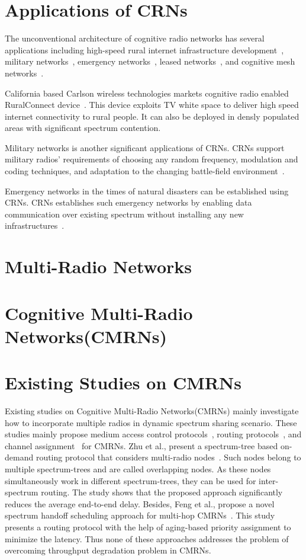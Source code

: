 \section{Applications of CRNs}
The unconventional architecture of cognitive radio networks has several applications including high-speed rural internet infrastructure development~\cite{fitch2011wireless}, military networks~\cite{murty2003software}, emergency networks~\cite{maldonado2005cognitive}, leased networks~\cite{stine2005spectrum}, and cognitive mesh networks~\cite{berlemann2005policy}.

California based Carlson wireless technologies markets cognitive radio enabled RuralConnect device~\cite{ruralConnect}. This device exploits TV white space to deliver high speed internet connectivity to rural people. It can also be deployed in densly populated areas with significant spectrum contention.

Military networks is another significant applications of CRNs. CRNs support military radios' requirements of choosing any random frequency, modulation and coding techniques, and adaptation to the changing battle-field environment~\cite{akyildiz2006next}.

Emergency networks in the times of natural disasters can be established using CRNs. CRNs establishes such emergency networks by enabling data communication over existing spectrum without installing any new infrastructures~\cite{maldonado2005cognitive}.

\section{Multi-Radio Networks}
\section{Cognitive Multi-Radio Networks(CMRNs)}

\section{Existing Studies on CMRNs}
Existing studies on Cognitive Multi-Radio Networks(CMRNs) mainly investigate how to incorporate multiple radios in dynamic spectrum sharing scenario. These studies mainly propose medium access control protocols~\cite{cormio2009survey, de2012survey}, routing protocols~\cite{zhu2008stod, feng2009joint}, and channel assignment~\cite{ahmadi2012distributed, zhong2014capacity} for CMRNs. Zhu et al., present a spectrum-tree based on-demand routing protocol that considers multi-radio nodes~\cite{zhu2008stod}. Such nodes belong to multiple spectrum-trees and are called overlapping nodes. As these nodes simultaneously work in different spectrum-trees, they can be used for inter-spectrum routing. The study shows that the proposed approach significantly reduces the average end-to-end delay.  Besides, Feng et al., propose a novel spectrum handoff scheduling approach for multi-hop CMRNs~\cite{feng2009joint}. This study presents a routing protocol with the help of aging-based priority assignment to minimize the latency. Thus none of these approaches addresses the problem of overcoming throughput degradation problem in CMRNs.

